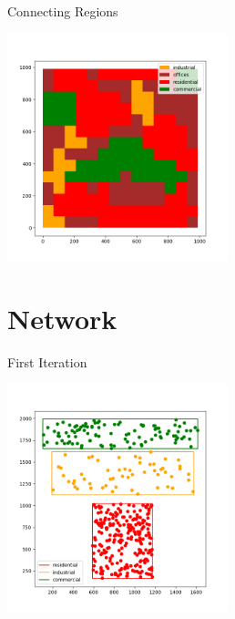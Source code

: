 \documentclass[10pt, aspectratio=169]{beamer}
\begin{document}
\begin{frame}{Connecting Regions}
    \begin{center}
        \includegraphics[height=6.6cm, keepaspectratio]{images/finalzoning.png}
    \end{center}
\end{frame}

\section{Network}

\begin{frame}{First Iteration}
    \begin{center}
        \includegraphics[height=6.6cm, keepaspectratio]{images/firstzoningwnodes.png}
    \end{center}
\end{frame}
\end{document}
